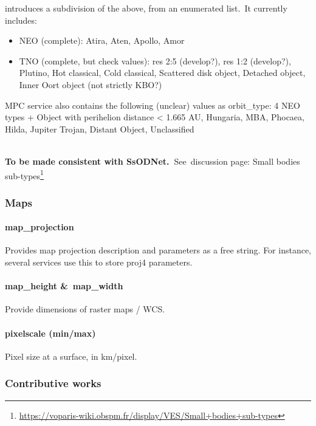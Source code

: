 \documentclass[11pt,a4paper]{ivoa}
\begin{document}
introduces a subdivision of the above, from an enumerated list. It currently includes:

\begin{itemize}
\item NEO (complete): Atira, Aten, Apollo, Amor
\item TNO (complete, but check values): res 2:5 (develop?), res 1:2 (develop?), Plutino, Hot classical, Cold classical, Scattered disk object, Detached object, Inner Oort object (not strictly KBO?)
\end{itemize}

MPC service also contains the following (unclear) values as orbit\_type: 4 NEO types + Object with perihelion distance < 1.665 AU, Hungaria, MBA, Phocaea, Hilda, Jupiter Trojan, Distant Object, Unclassified

\\

\textbf{To be made consistent with SsODNet. }See discussion page: Small bodies sub-types\footnote{\url{https://voparis-wiki.obspm.fr/display/VES/Small+bodies+sub-types}}

\subsubsection{Maps\\}

\paragraph{map\_projection}

Provides map projection description and parameters as a free string. For instance, several services use this to store proj4 parameters. 

\paragraph{map\_height \& map\_width}

Provide dimensions of raster maps / WCS.

\paragraph{pixelscale (min/max)}

Pixel size at a surface, in km/pixel.

\subsubsection{Contributive works\\}
\end{document}
